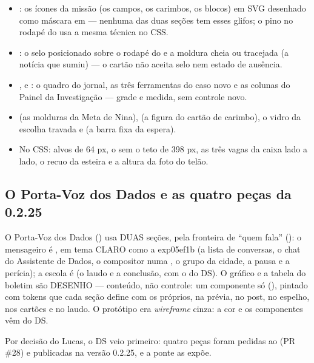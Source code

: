 \begin{itemize}
  \item {}: os ícones da missão (os campos, os carimbos, os
    blocos) em SVG desenhado como máscara em  --- nenhuma das
    duas seções tem esses glifos; o pino no rodapé do  usa a
    mesma técnica no CSS.
  \item {}: o selo posicionado sobre o rodapé do
     e a moldura cheia ou tracejada (a notícia que sumiu) ---
    o cartão não aceita selo nem estado de ausência.
  \item {},  e
    : o quadro do jornal, as três ferramentas do caso
    novo e as colunas do Painel da Investigação --- grade e medida, sem
    controle novo.
  \item {} (as molduras da Meta de Nina),
     (a figura do cartão de carimbo), o vidro da
    escolha travada e  (a barra fixa da espera).
  \item No CSS: alvos de 64 px, o  sem o teto de 398 px, as três
    vagas da caixa lado a lado, o recuo da esteira e a altura da foto do telão.
\end{itemize}

\subsection{O Porta-Voz dos Dados e as quatro peças da 0.2.25}
\label{sec:ds-exp03em1b}

O Porta-Voz dos Dados () usa DUAS seções, pela fronteira de
\enquote{quem fala} (): o mensageiro é , em tema
CLARO como a exp05ef1b (a lista de conversas, o chat do Assistente de Dados, o
compositor numa , o grupo da cidade, a pausa e a perícia); a
escola é  (o laudo e a conclusão, com o  do DS). O
gráfico e a tabela do boletim são DESENHO --- conteúdo, não controle: um
componente só (), pintado com tokens
 que cada seção define com os próprios, na prévia, no post, no
espelho, nos cartões e no laudo. O protótipo era \emph{wireframe} cinza: a
cor e os componentes vêm do DS.

Por decisão do Lucas, o DS veio primeiro: quatro peças foram pedidas ao
 (PR \#28) e publicadas na versão 0.2.25, e a ponte
 as expõe.

